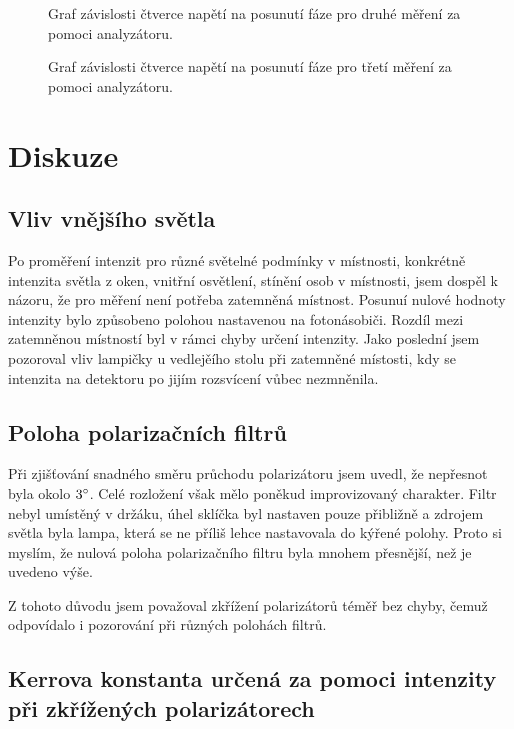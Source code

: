 \documentclass[a4paper,12pt]{article}
\begin{document}
\begin{figure}
\begin{center}

\end{center}
\caption{Graf závislosti čtverce napětí na posunutí fáze pro druhé měření za pomoci analyzátoru.}
\label{5b}
\end{figure}

\begin{figure}
\begin{center}

\end{center}
\caption{Graf závislosti čtverce napětí na posunutí fáze pro třetí měření za pomoci analyzátoru.}
\label{5c}
\end{figure}

\section{Diskuze}
\subsection{Vliv vnějšího světla}
Po proměření intenzit pro různé světelné podmínky v místnosti, konkrétně intenzita světla z oken, vnitřní osvětlení, stínění osob v místnosti, jsem dospěl 
k názoru, že pro měření není potřeba zatemněná místnost. Posunuí nulové hodnoty intenzity bylo způsobeno polohou nastavenou na fotonásobiči. Rozdíl mezi zatemněnou 
místností byl v rámci chyby určení intenzity. Jako poslední jsem pozoroval vliv lampičky u vedlejěího stolu při zatemněné místosti, kdy se intenzita na detektoru 
po jijím rozsvícení vůbec nezmněnila.

\subsection{Poloha polarizačních filtrů}
Při zjišťování snadného směru průchodu polarizátoru jsem uvedl, že nepřesnot byla okolo $3^{\circ}$. Celé rozložení však mělo poněkud improvizovaný charakter. Filtr nebyl 
umístěný v držáku, úhel sklíčka byl nastaven pouze přibližně a zdrojem světla byla lampa, která se ne příliš lehce nastavovala do kýřené polohy. Proto si myslím, že 
nulová poloha polarizačního filtru byla mnohem přesnější, než je uvedeno výše.

Z tohoto důvodu jsem považoval zkřížení polarizátorů téměř bez chyby, čemuž odpovídalo i pozorování při různých polohách filtrů. 

\subsection{Kerrova konstanta určená za pomoci intenzity při zkřížených polarizátorech}
\end{document}
